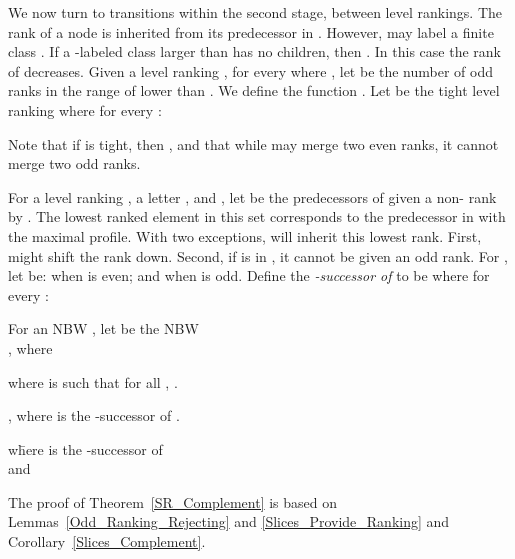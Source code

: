 \documentclass{LMCS}
\newcommand\hide[1]{}
\begin{document}
We now turn to transitions within the second stage, between level rankings.  The rank of a node 
is inherited from its predecessor  in . However,  may label a finite class . If a
-labeled class larger than  has no children, then . In this
case the rank of  decreases.  Given a level ranking , for every  where , let  be the
number of odd ranks in the range of  lower than . We define the function . Let  be  the tight level ranking  where for every : 
\hide{if , then ; if , then ; and if ,
then .}
{

}
Note that if  is tight, then , and that while  may merge
two even ranks, it cannot merge two odd ranks.

For a level ranking , a letter , and , let
 be the predecessors of 
given a non- rank by . The lowest ranked element in this set corresponds to the
predecessor in  with the maximal profile. With two exceptions,  will inherit this lowest rank. 
First, \tighten might shift the rank down. Second, if  is in , it cannot be given
an odd rank. For , let  be:  when  is even; and  when
 is odd.  Define the \emph{-successor of } to be  where for every :



\begin{defi}\label{Slice_Rank}
For an NBW , let  be the NBW\\
, where
\begin{iteMize}{}
\item  where  is such that for all , .
\item ,
where  is the -successor of .
\item \begin{tabbing}
 
           w\=here  is the -successor of \\
           \>and 
\end{tabbing}\vspace{6 pt}
\end{iteMize}
\end{defi}

\noindent The proof of Theorem~\ref{SR_Complement} is based on Lemmas~\ref{Odd_Ranking_Rejecting} and
\ref{Slices_Provide_Ranking} and Corollary~\ref{Slices_Complement}.
\end{document}
